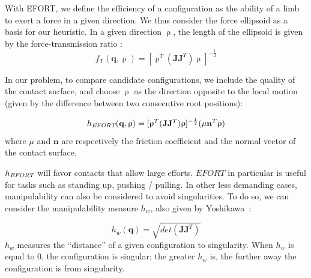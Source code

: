 \documentclass[journal]{IEEEtran}
\providecommand{\DIFaddtex}[1]{#1} %
\providecommand{\DIFdeltex}[1]{} %
\providecommand{\DIFaddbegin}{\protect\color{blue}} %
\providecommand{\DIFaddend}{\protect\color{black}} %
\providecommand{\DIFdelbegin}{\protect\cbdelete} %
\providecommand{\DIFdelend}{} %
\providecommand{\DIFadd}[1]{\texorpdfstring{\DIFaddtex{#1}}{#1}} %
\providecommand{\DIFdel}[1]{\texorpdfstring{\DIFdeltex{#1}}{}} %
\begin{document}
With EFORT, we define the efficiency of a configuration as the ability of a limb to exert a force in a given direction.
We thus consider the force ellipsoid as a basis for our heuristic.
In a given direction $\uprho$, the length of the ellipsoid is given by the force-transmission ratio \citep{1087795}:
\begin{equation*}
f_\mathsf{T}(\mathbf{q}, \uprho) = [\uprho^{T}(\mathbf{J}\mathbf{J}	^{T})\uprho]^{-\frac{1}{2}}
\end{equation*}

In our problem, to compare candidate configurations, we include the quality of the contact surface, and choose $\uprho$ as the direction
opposite to the local motion (given by the difference between two consecutive root positions):

\begin{equation}
h_{\textrm{\it EFORT}}(\mathbf{q}, \uprho) = [\uprho^{T}(\mathbf{J}\mathbf{J}^T)\uprho]^{-\frac{1}{2}} ( \mu \mathbf{n}^T \uprho)
\end{equation}
where $\mu$ and $\mathbf{n}$ are respectively the friction coefficient and the normal vector of the contact surface.



$h_{\textrm{\it EFORT}}$ \DIFdelbegin \DIFdel{and $h_{vel}$ }\DIFdelend will favor contacts that allow large efforts\DIFdelbegin \DIFdel{or fast modifications in the velocity}\DIFdelend .
$EFORT$ in particular is useful for tasks such as standing up, pushing / pulling.
In other less demanding cases, manipulability can also be considered to avoid singularities.
To do so, we can consider the manipulability measure $h_{w}$, also given by Yoshikawa\DIFaddbegin \DIFadd{~\cite{Yoshikawa1984}}\DIFaddend :

\begin{equation} \label{ellipsoid}
h_{w}(\mathbf{q}) = \sqrt{det(\mathbf{J}\mathbf{J}^T)}
\end{equation}
$h_{w}$ measures the ``distance'' of a given configuration to singularity. When $h_{w}$ is equal to 0, the configuration is singular;
the greater $h_{w}$ is, the further away the configuration is from singularity.
\end{document}

